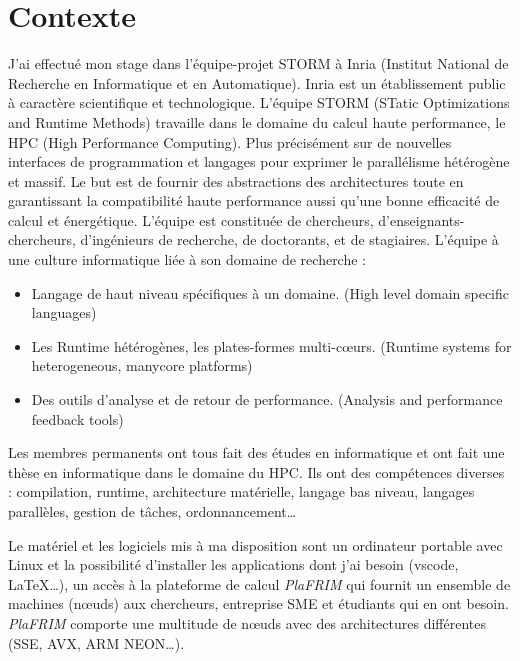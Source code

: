 \section{Contexte}
J'ai effectué mon stage dans l'équipe-projet STORM à Inria (Institut National de
Recherche en Informatique et en Automatique). Inria est un établissement public à
caractère scientifique et technologique.
L'équipe STORM (STatic Optimizations and Runtime Methods) travaille dans le domaine du
calcul haute performance, le HPC (High Performance Computing). Plus précisément sur
de  nouvelles interfaces de programmation et langages pour exprimer le parallélisme
hétérogène et massif. Le but est de fournir des abstractions des architectures toute en
garantissant la compatibilité haute performance aussi qu'une bonne efficacité de calcul
et énergétique.
L'équipe est constituée de chercheurs, d'enseignants-chercheurs, d'ingénieurs de recherche,
de doctorants, et de stagiaires.
L'équipe à une culture informatique liée à son domaine de recherche :

\begin{itemize}
  \item Langage de haut niveau spécifiques à un domaine. (High level domain specific languages)
  \item Les Runtime hétérogènes, les plates-formes multi-cœurs. (Runtime systems for heterogeneous, manycore platforms)
  \item Des outils d'analyse et de retour de performance. (Analysis and performance feedback tools)
\end{itemize}

Les membres permanents ont tous fait des études en informatique et ont fait une thèse en
informatique dans le domaine du HPC. Ils ont des compétences diverses : compilation, runtime,
architecture matérielle, langage bas niveau, langages parallèles, gestion de tâches, ordonnancement\dots

Le matériel et les logiciels mis à ma disposition sont un ordinateur portable avec Linux
et la possibilité d'installer les applications dont j'ai besoin (vscode, \LaTeX\dots), un
accès à la plateforme de calcul \emph{PlaFRIM} qui fournit un ensemble de machines (nœuds)
aux chercheurs, entreprise SME et étudiants qui en ont besoin. \emph{PlaFRIM} comporte une
multitude de nœuds avec des architectures différentes (SSE, AVX, ARM NEON\dots).
